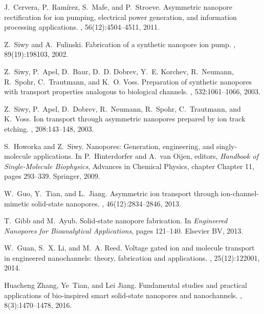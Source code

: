 \documentclass[fleqn,10pt]{SelfArx} %
\begin{document}
\begin{thebibliography}{10}
J.~Cervera, P.~Ram{\'i}rez, S.~Mafe, and P.~Stroeve.
\newblock Asymmetric nanopore rectification for ion pumping, electrical power
  generation, and information processing applications.
, 56(12):4504--4511, 2011.

Z.~Siwy and A.~Fulinski.
\newblock Fabrication of a synthetic nanopore ion pump.
, 89(19):198103, 2002.

Z.~Siwy, P.~Apel, D.~Baur, D.~D. Dobrev, Y.~E. Korchev, R.~Neumann, R.~Spohr,
  C.~Trautmann, and K.~O. Voss.
\newblock Preparation of synthetic nanopores with transport properties
  analogous to biological channels.
, 532:1061--1066, 2003.

Z.~Siwy, P.~Apel, D.~Dobrev, R.~Neumann, R.~Spohr, C.~Trautmann, and K.~Voss.
\newblock Ion transport through asymmetric nanopores prepared by ion track
  etching.
, 208:143--148, 2003.

S.~Howorka and Z.~Siwy.
\newblock Nanopores: Generation, engineering, and singly-molecule applications.
\newblock In P.~Hinterdorfer and A.~van Oijen, editors, {\em Handbook of
  Single-Molecule Biophysics}, Advances in Chemical Physics, chapter Chapter
  11, pages 293--339. Springer, 2009.

W.~Guo, Y.~Tian, and L.~Jiang.
\newblock Asymmetric ion transport through ion-channel-mimetic solid-state
  nanopores.
, 46(12):2834--2846, 2013.

T.~Gibb and M.~Ayub.
\newblock Solid-state nanopore fabrication.
\newblock In {\em Engineered Nanopores for Bioanalytical Applications}, pages
  121--140. Elsevier {BV}, 2013.

W.~Guan, S.~X. Li, and M.~A. Reed.
\newblock Voltage gated ion and molecule transport in engineered nanochannels:
  theory, fabrication and applications.
, 25(12):122001, 2014.

Huacheng Zhang, Ye~Tian, and Lei Jiang.
\newblock Fundamental studies and practical applications of bio-inspired smart
  solid-state nanopores and nanochannels.
, 8(3):1470--1478, 2016.


\end{thebibliography}
\end{document}
